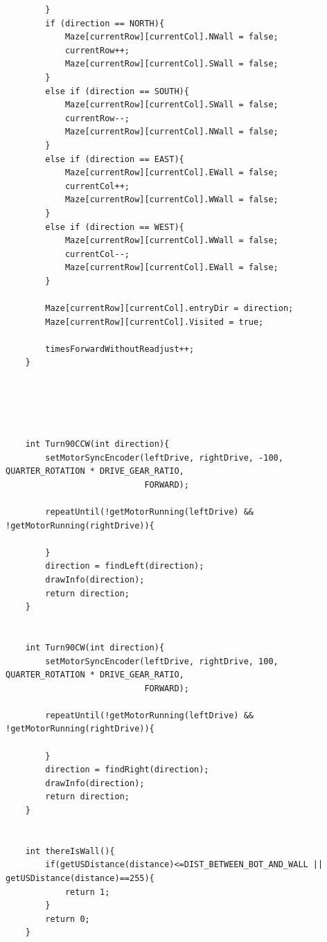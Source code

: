 \documentclass[11pt]{article}
\begin{document}
\begin{linenumbers}
\begin{verbatim}
        }
        if (direction == NORTH){
            Maze[currentRow][currentCol].NWall = false;
            currentRow++;
            Maze[currentRow][currentCol].SWall = false;
        }
        else if (direction == SOUTH){
            Maze[currentRow][currentCol].SWall = false;
            currentRow--;
            Maze[currentRow][currentCol].NWall = false;
        }
        else if (direction == EAST){
            Maze[currentRow][currentCol].EWall = false;
            currentCol++;
            Maze[currentRow][currentCol].WWall = false;
        }
        else if (direction == WEST){
            Maze[currentRow][currentCol].WWall = false;
            currentCol--;
            Maze[currentRow][currentCol].EWall = false;
        }

        Maze[currentRow][currentCol].entryDir = direction;
        Maze[currentRow][currentCol].Visited = true;

        timesForwardWithoutReadjust++;
    }





    int Turn90CCW(int direction){
        setMotorSyncEncoder(leftDrive, rightDrive, -100, QUARTER_ROTATION * DRIVE_GEAR_RATIO, 
                            FORWARD);

        repeatUntil(!getMotorRunning(leftDrive) && !getMotorRunning(rightDrive)){

        }
        direction = findLeft(direction);
        drawInfo(direction);
        return direction;
    }


    int Turn90CW(int direction){
        setMotorSyncEncoder(leftDrive, rightDrive, 100, QUARTER_ROTATION * DRIVE_GEAR_RATIO,
                            FORWARD);

        repeatUntil(!getMotorRunning(leftDrive) && !getMotorRunning(rightDrive)){

        }
        direction = findRight(direction);
        drawInfo(direction);
        return direction;
    }


    int thereIsWall(){
        if(getUSDistance(distance)<=DIST_BETWEEN_BOT_AND_WALL || getUSDistance(distance)==255){
            return 1;
        }
        return 0;
    }



\end{verbatim}
\end{linenumbers}
\end{document}
